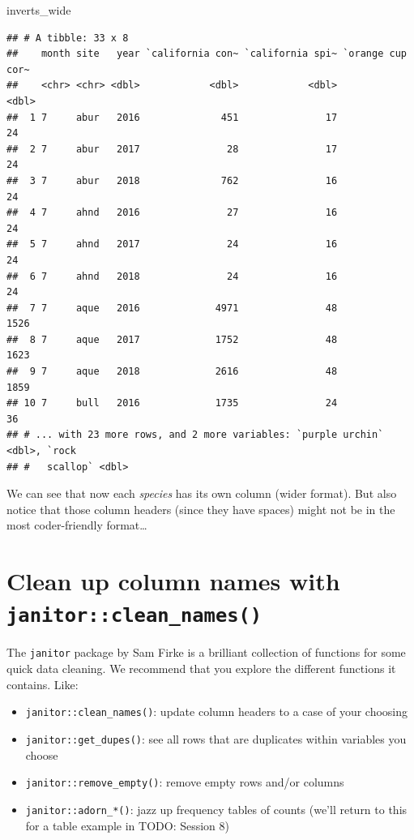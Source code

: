 \documentclass[]{book}
\newenvironment{Shaded}{\begin{snugshade}}{\end{snugshade}}
\newcommand{\NormalTok}[1]{#1}
\providecommand{\tightlist}{%
  \setlength{\itemsep}{0pt}\setlength{\parskip}{0pt}}
\begin{document}
\begin{Shaded}
\begin{Highlighting}[]
\NormalTok{inverts_wide}
\end{Highlighting}
\end{Shaded}

\begin{verbatim}
## # A tibble: 33 x 8
##    month site   year `california con~ `california spi~ `orange cup cor~
##    <chr> <chr> <dbl>            <dbl>            <dbl>            <dbl>
##  1 7     abur   2016              451               17               24
##  2 7     abur   2017               28               17               24
##  3 7     abur   2018              762               16               24
##  4 7     ahnd   2016               27               16               24
##  5 7     ahnd   2017               24               16               24
##  6 7     ahnd   2018               24               16               24
##  7 7     aque   2016             4971               48             1526
##  8 7     aque   2017             1752               48             1623
##  9 7     aque   2018             2616               48             1859
## 10 7     bull   2016             1735               24               36
## # ... with 23 more rows, and 2 more variables: `purple urchin` <dbl>, `rock
## #   scallop` <dbl>
\end{verbatim}

We can see that now each \emph{species} has its own column (wider format). But also notice that those column headers (since they have spaces) might not be in the most coder-friendly format\ldots{}

\hypertarget{clean-up-column-names-with-janitorclean_names}{%
\section{\texorpdfstring{Clean up column names with \texttt{janitor::clean\_names()}}{Clean up column names with janitor::clean\_names()}}\label{clean-up-column-names-with-janitorclean_names}}

The \texttt{janitor} package by Sam Firke is a brilliant collection of functions for some quick data cleaning. We recommend that you explore the different functions it contains. Like:

\begin{itemize}
\tightlist
\item
  \texttt{janitor::clean\_names()}: update column headers to a case of your choosing
\item
  \texttt{janitor::get\_dupes()}: see all rows that are duplicates within variables you choose
\item
  \texttt{janitor::remove\_empty()}: remove empty rows and/or columns
\item
  \texttt{janitor::adorn\_*()}: jazz up frequency tables of counts (we'll return to this for a table example in TODO: Session 8)
\end{itemize}
\end{document}
